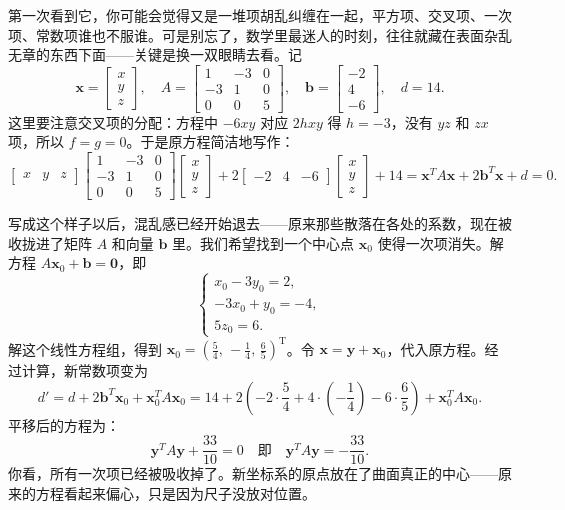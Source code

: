 \documentclass[UTF8]{ctexbook}
\begin{document}
第一次看到它，你可能会觉得又是一堆项胡乱纠缠在一起，平方项、交叉项、一次项、常数项谁也不服谁。可是别忘了，数学里最迷人的时刻，往往就藏在表面杂乱无章的东西下面——关键是换一双眼睛去看。记
\[
\mathbf{x} = \begin{bmatrix} x \\ y \\ z \end{bmatrix},\quad
A = \begin{bmatrix}
1 & -3 & 0 \\
-3 & 1 & 0 \\
0 & 0 & 5
\end{bmatrix},\quad
\mathbf{b} = \begin{bmatrix} -2 \\ 4 \\ -6 \end{bmatrix},\quad d = 14.
\]
这里要注意交叉项的分配：方程中 \(-6xy\) 对应 \(2hxy\) 得 \(h=-3\)，没有 \(yz\) 和 \(zx\) 项，所以 \(f=g=0\)。于是原方程简洁地写作：
\[
\begin{bmatrix} x & y & z \end{bmatrix}
\begin{bmatrix}
1 & -3 & 0 \\
-3 & 1 & 0 \\
0 & 0 & 5
\end{bmatrix}
\begin{bmatrix} x \\ y \\ z \end{bmatrix}
+ 2\begin{bmatrix} -2 & 4 & -6 \end{bmatrix}
\begin{bmatrix} x \\ y \\ z \end{bmatrix}
+ 14 = \mathbf{x}^T A \mathbf{x} + 2\mathbf{b}^T \mathbf{x} + d = 0.
\]

写成这个样子以后，混乱感已经开始退去——原来那些散落在各处的系数，现在被收拢进了矩阵 \(A\) 和向量 \(\mathbf{b}\) 里。我们希望找到一个中心点 \(\mathbf{x}_0\) 使得一次项消失。解方程 \(A\mathbf{x}_0 + \mathbf{b} = \mathbf{0}\)，即
\[
\begin{cases}
x_0 - 3y_0 = 2,\\
-3x_0 + y_0 = -4,\\
5z_0 = 6.
\end{cases}
\]
解这个线性方程组，得到 \(\mathbf{x}_0 = \left(\frac{5}{4},\, -\frac{1}{4},\, \frac{6}{5}\right)^\mathrm{T}\)。令 \(\mathbf{x} = \mathbf{y} + \mathbf{x}_0\)，代入原方程。经过计算，新常数项变为
\[
d' = d + 2\mathbf{b}^T\mathbf{x}_0 + \mathbf{x}_0^T A \mathbf{x}_0 = 14 + 2(-2\cdot\frac{5}{4}+4\cdot(-\frac{1}{4})-6\cdot\frac{6}{5}) + \mathbf{x}_0^T A \mathbf{x}_0.
\]
平移后的方程为：
\[
\mathbf{y}^T A \mathbf{y} + \frac{33}{10} = 0 \quad \text{即} \quad \mathbf{y}^T A \mathbf{y} = -\frac{33}{10}.
\]
你看，所有一次项已经被吸收掉了。新坐标系的原点放在了曲面真正的中心——原来的方程看起来偏心，只是因为尺子没放对位置。
\end{document}
